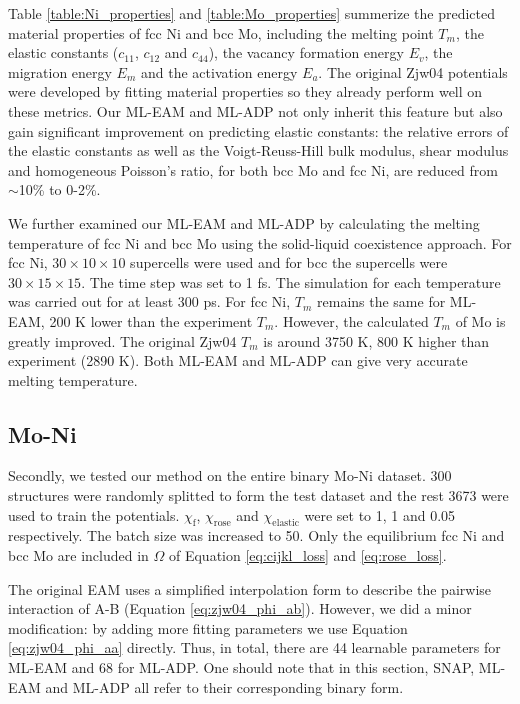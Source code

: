 \documentclass[prb,reprint]{revtex4-2}
\begin{document}
Table \ref{table:Ni_properties} and \ref{table:Mo_properties} summerize the 
predicted material properties of fcc Ni and bcc Mo, including the melting point 
$T_{m}$, the elastic constants ($c_{11}$, $c_{12}$ and $c_{44}$), the vacancy 
formation energy $E_{v}$, the migration energy $E_{m}$ and the activation energy 
$E_{a}$. The original Zjw04 potentials were developed by fitting material 
properties so they already perform well on these metrics. Our ML-EAM and ML-ADP 
not only inherit this feature but also gain significant improvement on 
predicting elastic constants: the relative errors of the elastic constants as 
well as the Voigt-Reuss-Hill bulk modulus, shear modulus and homogeneous 
Poisson's ratio, for both bcc Mo and fcc Ni, are reduced from $\sim$10\% to 
0-2\%.

We further examined our ML-EAM and ML-ADP by calculating the melting temperature
of fcc Ni and bcc Mo using the solid-liquid coexistence approach. For fcc Ni, 
$30 \times 10 \times 10$ supercells were used and for bcc the supercells were 
$30 \times 15 \times 15$. The time step was set to 1 fs. The simulation for each 
temperature was carried out for at least 300 ps. For fcc Ni, $T_{m}$ remains the 
same for ML-EAM, 200 K lower than the experiment $T_m$. However, the calculated 
$T_{m}$ of Mo is greatly improved. The original Zjw04 $T_{m}$ is around 3750 K, 
800 K higher than experiment (2890 K). Both ML-EAM and ML-ADP can give very 
accurate melting temperature. 

% 
%
\subsection{Mo-Ni}
\label{sec:alloy}

Secondly, we tested our method on the entire binary Mo-Ni dataset. 300 
structures were randomly splitted to form the test dataset and the rest 3673 
were used to train the potentials. $\chi_{\mathrm{f}}$, $\chi_{\mathrm{rose}}$ 
and $\chi_{\mathrm{elastic}}$ were set to 1, 1 and 0.05 respectively. The batch 
size was increased to 50. Only the equilibrium fcc Ni and bcc Mo are included in 
$\Omega$ of Equation \ref{eq:cijkl_loss} and \ref{eq:rose_loss}.

The original EAM uses a simplified interpolation form to describe the pairwise 
interaction of A-B (Equation \ref{eq:zjw04_phi_ab}). However, we did a minor 
modification: by adding more fitting parameters we use Equation 
\ref{eq:zjw04_phi_aa} directly. Thus, in total, there are 44 learnable 
parameters for ML-EAM and 68 for ML-ADP. One should note that in this section, 
SNAP, ML-EAM and ML-ADP all refer to their corresponding binary form.
\end{document}
